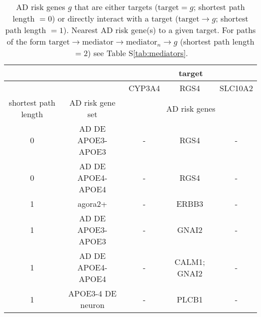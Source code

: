 \documentclass[letterpaper]{article}
\begin{document}
\begin{table}[p]
\begin{tabular}{cc||c|c|c}
\toprule
                       &                     &  \multicolumn{3}{c}{target}        \\
\midrule
                       &   {}                &  CYP3A4 &          RGS4 &  SLC10A2 \\
\midrule
shortest path length   & AD risk gene set         &  \multicolumn{3}{c}{AD risk genes}        \\
\midrule
                    0  &   AD DE APOE3-APOE3 &    -    &          RGS4 &    -     \\
                    0  &   AD DE APOE4-APOE4 &    -    &          RGS4 &    -     \\
\midrule
                    1  &   agora2+           &    -    &         ERBB3 &    -     \\
                    1  &   AD DE APOE3-APOE3 &    -    &         GNAI2 &    -     \\
                    1  &   AD DE APOE4-APOE4 &    -    &  CALM1; GNAI2 &    -     \\
                    1  &   APOE3-4 DE neuron &    -    &         PLCB1 &    -     \\
\bottomrule
\end{tabular}
\caption{
  AD risk genes $g$ that are either targets ($\mathrm{target} = g$; shortest path length $=0$) or directly
  interact with a target ($\mathrm{target} \rightarrow g$; shortest path length $=1$).
  Nearest AD risk gene(s) to a given target.  For paths of the form $\mathrm{target}
  \rightarrow \mathrm{mediator} \rightarrow
  \mathrm{mediator}_n \rightarrow g$ (shortest path length $= 2$) see Table
  S\ref{tab:mediators}.
}
\label{tab:nearest-ADgenes}
\end{table}
\end{document}
